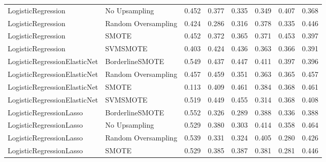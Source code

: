 \begin{tabular}{llllllll}
          LogisticRegression &       No Upsampling & 0.452 &                     0.377 &                 0.335 &                  0.349 &                                   0.407 &    0.368 \\
          LogisticRegression & Random Oversampling & 0.424 &                     0.286 &                 0.316 &                  0.378 &                                   0.335 &    0.446 \\
          LogisticRegression &               SMOTE & 0.452 &                     0.372 &                 0.365 &                  0.371 &                                   0.453 &    0.397 \\
          LogisticRegression &            SVMSMOTE & 0.403 &                     0.424 &                 0.436 &                  0.363 &                                   0.366 &    0.391 \\
LogisticRegressionElasticNet &     BorderlineSMOTE & 0.549 &                     0.437 &                 0.447 &                  0.411 &                                   0.397 &    0.396 \\
LogisticRegressionElasticNet & Random Oversampling & 0.457 &                     0.459 &                 0.351 &                  0.363 &                                   0.365 &    0.457 \\
LogisticRegressionElasticNet &               SMOTE & 0.113 &                     0.409 &                 0.461 &                  0.384 &                                   0.368 &    0.461 \\
LogisticRegressionElasticNet &            SVMSMOTE & 0.519 &                     0.449 &                 0.455 &                  0.314 &                                   0.368 &    0.408 \\
     LogisticRegressionLasso &     BorderlineSMOTE & 0.552 &                     0.326 &                 0.289 &                  0.388 &                                   0.336 &    0.388 \\
     LogisticRegressionLasso &       No Upsampling & 0.529 &                     0.380 &                 0.303 &                  0.414 &                                   0.358 &    0.464 \\
     LogisticRegressionLasso & Random Oversampling & 0.539 &                     0.331 &                 0.324 &                  0.405 &                                   0.280 &    0.426 \\
     LogisticRegressionLasso &               SMOTE & 0.529 &                     0.385 &                 0.387 &                  0.381 &                                   0.281 &    0.446 \\

\end{tabular}

